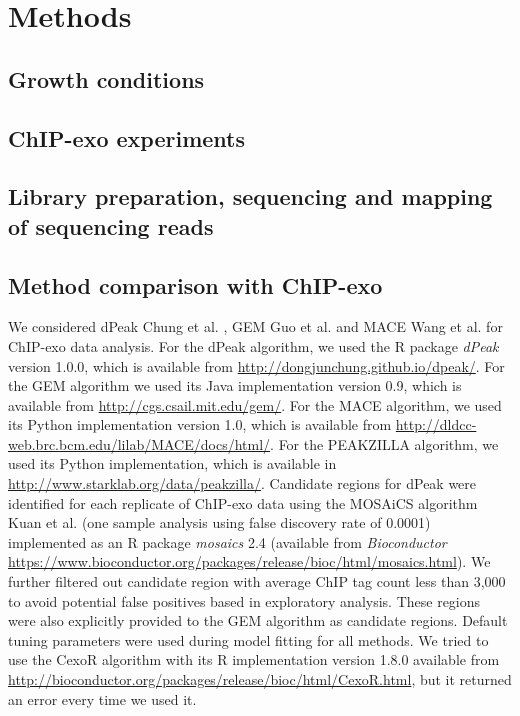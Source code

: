 \documentclass{bmcart}\usepackage[]{graphicx}\usepackage[]{color}
\begin{document}
\section{Methods}
\label{sec:methods}

\color{red}

\subsection{Growth conditions}
\label{sec:growth}


\subsection{ChIP-exo experiments}
\label{sec:experiments}



\subsection{Library preparation, sequencing and mapping of sequencing reads}
\label{sec:library}

\color{black}

\subsection{Method comparison with ChIP-exo}
\label{sec:suppcomp}

We considered dPeak Chung et al. \cite{dpeak}, GEM Guo et
al. \cite{gem} and MACE Wang et al. \cite{mace} for ChIP-exo data
analysis. For the dPeak algorithm, we used the R package \emph{dPeak}
version 1.0.0, which is available from
\url{http://dongjunchung.github.io/dpeak/}. For the GEM algorithm we
used its Java implementation version 0.9, which is available from
\url{http://cgs.csail.mit.edu/gem/}. For the MACE algorithm, we used
its Python implementation version 1.0, which is available from
\url{http://dldcc-web.brc.bcm.edu/lilab/MACE/docs/html/}. For the
PEAKZILLA algorithm, we used its Python implementation, which is
available in \url{http://www.starklab.org/data/peakzilla/}. Candidate
regions for dPeak were identified for each replicate of ChIP-exo data
using the MOSAiCS algorithm Kuan et al. \cite{mosaics} (one sample
analysis using false discovery rate of 0.0001) implemented as an R
package \emph{mosaics} 2.4 (available from \emph{Bioconductor}
\url{https://www.bioconductor.org/packages/release/bioc/html/mosaics.html}).
We further filtered out candidate region with average ChIP tag count
less than 3,000 to avoid potential false positives based in
exploratory analysis. These regions were also explicitly provided to
the GEM algorithm as candidate regions. Default tuning parameters were
used during model fitting for all methods. We tried to use the CexoR
algorithm with its R implementation version 1.8.0 available from
\url{http://bioconductor.org/packages/release/bioc/html/CexoR.html},
but it returned an error every time we used it.
\end{document}
